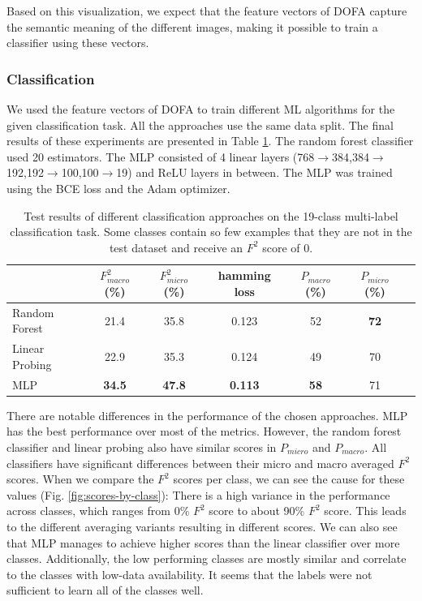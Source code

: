 Based on this visualization, we expect that the feature vectors of DOFA capture the semantic meaning of the different images, making it possible to train a classifier using these vectors.

\subsubsection{Classification}

We used the feature vectors of DOFA to train different ML algorithms for the given classification task. All the approaches use the same data split. The final results of these experiments are presented in Table \ref{fig:test-results}. The random forest classifier used 20 estimators. The MLP consisted of 4 linear layers (768$\rightarrow$384,384$\rightarrow$192,192$\rightarrow$100,100$\rightarrow$19) and ReLU layers in between. The MLP was trained using the BCE loss and the Adam optimizer.

\begin{table}[h]
  \centering
  \begin{tabular}{lcccccc}
    \textbf{} & \textbf{$F^2_{macro}$ (\%)} & \textbf{$F^2_{micro}$ (\%)} & \textbf{hamming loss} & \textbf{$P_{macro}$ (\%)} & \textbf{$P_{micro}$ (\%)} \\
    \hline
    Random Forest & 21.4 & 35.8 & 0.123 & 52 & \textbf{72} \\
    Linear Probing & 22.9 & 35.3 & 0.124 & 49 & 70 \\
    MLP & \textbf{34.5} & \textbf{47.8} & \textbf{0.113} & \textbf{58} & 71 \\
  \end{tabular}
  \caption{Test results of different classification approaches on the 19-class multi-label classification task. Some classes contain so few examples that they are not in the test dataset and receive an $F^2$ score of 0.}
  \label{fig:test-results}
\end{table}

There are notable differences in the performance of the chosen approaches. MLP has the best performance over most of the metrics. However, the random forest classifier and linear probing also have similar scores in $P_{micro}$ and $P_{macro}$. All classifiers have significant differences between their micro and macro averaged $F^2$ scores. When we compare the $F^2$ scores per class, we can see the cause for these values (Fig. \ref{fig:scores-by-class}): There is a high variance in the performance across classes, which ranges from 0\% $F^2$ score to about 90\% $F^2$ score. This leads to the different averaging variants resulting in different scores. We can also see that MLP manages to achieve higher scores than the linear classifier over more classes. Additionally, the low performing classes are mostly similar and correlate to the classes with low-data availability. It seems that the labels were not sufficient to learn all of the classes well.

